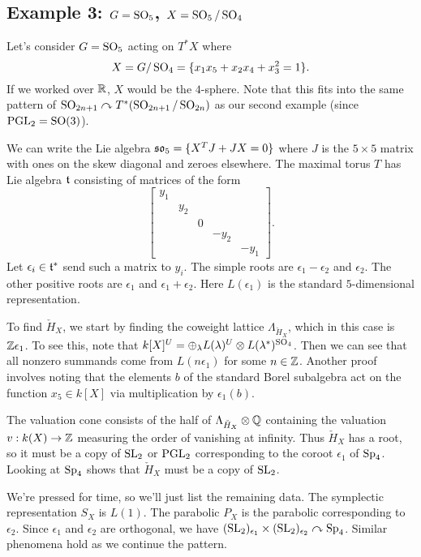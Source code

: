 \documentclass{article}
\begin{document}
\subsection{Example 3: $G = \operatorname{SO}_5$, $X = \operatorname{SO}_5 / \operatorname{SO}_4$}

Let's consider $G = \operatorname{SO}_5$ acting on $T^*X$ where 
\[
	X = G / \operatorname{SO}_4 = \{ x_1 x_5 + x_2 x_4 + x_3^2 = 1 \}.
\]
If we worked over $\mathbb{R}$, $X$ would be the $4$-sphere.
Note that this fits into the same pattern of $\operatorname{SO}_{2n+1} \curvearrowright T^*(\operatorname{SO}_{2n+1}/\operatorname{SO}_{2n})$ as our second example (since $\operatorname{PGL}_2 = \operatorname{SO}(3)$).

We can write the Lie algebra $\mathfrak{so}_5 = \{ X^T J + JX = 0 \}$ where $J$ is the $5 \times 5$ matrix with ones on the skew diagonal and zeroes elsewhere.
The maximal torus $T$ has Lie algebra $\mathfrak{t}$ consisting of matrices of the form
\[
	\begin{bmatrix}
		y_1 & & & & \\
		& y_2 & & & \\
		& & 0 & & \\
		& & & -y_2 & \\
		& & & & -y_1
	\end{bmatrix}.
\]
Let $\epsilon_i \in \mathfrak{t}^*$ send such a matrix to $y_i$.
The simple roots are $\epsilon_1 - \epsilon_2$ and $\epsilon_2$.
The other positive roots are $\epsilon_1$ and $\epsilon_1 + \epsilon_2$.
Here $L(\epsilon_1)$ is the standard $5$-dimensional representation.

To find $\check{H}_X$, we start by finding the coweight lattice $\Lambda_{\check{H}_X}$, which in this case is $\mathbb{Z} \epsilon_1$.
To see this, note that $k[X]^U = \oplus_\lambda L(\lambda)^U \otimes L(\lambda^*)^{\operatorname{SO}_4}$.
Then we can see that all nonzero summands come from $L(n \epsilon_1)$ for some $n \in \mathbb{Z}$.
Another proof involves noting that the elements $b$ of the standard Borel subalgebra act on the function $x_5 \in k[X]$ via multiplication by $\epsilon_1(b)$.

The valuation cone consists of the half of $\Lambda_{\check{H}_X} \otimes \mathbb{Q}$ containing the valuation $v: k(X) \to \mathbb{Z}$ measuring the order of vanishing at infinity.
Thus $\check{H}_X$ has a root, so it must be a copy of $\operatorname{SL}_2$ or $\operatorname{PGL}_2$ corresponding to the coroot $\epsilon_1$ of $\operatorname{Sp}_4$.
Looking at $\operatorname{Sp}_4$ shows that $\check{H}_X$ must be a copy of $\operatorname{SL}_2$.

We're pressed for time, so we'll just list the remaining data.
The symplectic representation $S_X$ is $L(1)$.
The parabolic $P_X$ is the parabolic corresponding to $\epsilon_2$.
Since $\epsilon_1$ and $\epsilon_2$ are orthogonal, we have $(\operatorname{SL}_2)_{\epsilon_1} \times (\operatorname{SL}_2)_{\epsilon_2} \curvearrowright \operatorname{Sp}_4$.
Similar phenomena hold as we continue the pattern.
\end{document}
